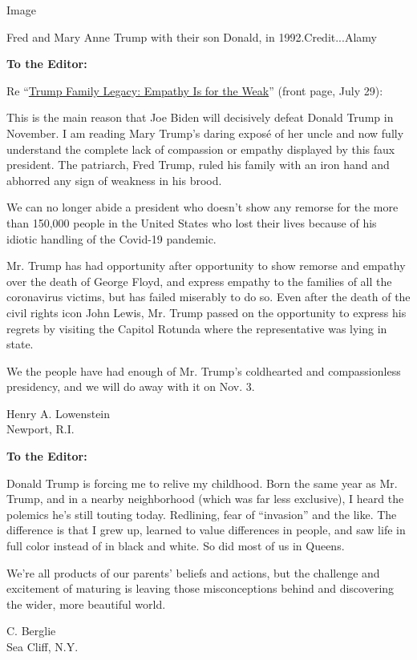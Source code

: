 Image

Fred and Mary Anne Trump with their son Donald, in 1992.Credit...Alamy

\textbf{To the Editor:}

Re
``\href{https://www.nytimes.com/2020/07/28/us/politics/donald-fred-trump.html}{Trump
Family Legacy: Empathy Is for the Weak}'' (front page, July 29):

This is the main reason that Joe Biden will decisively defeat Donald
Trump in November. I am reading Mary Trump's daring exposé of her uncle
and now fully understand the complete lack of compassion or empathy
displayed by this faux president. The patriarch, Fred Trump, ruled his
family with an iron hand and abhorred any sign of weakness in his brood.

We can no longer abide a president who doesn't show any remorse for the
more than 150,000 people in the United States who lost their lives
because of his idiotic handling of the Covid-19 pandemic.

Mr. Trump has had opportunity after opportunity to show remorse and
empathy over the death of George Floyd, and express empathy to the
families of all the coronavirus victims, but has failed miserably to do
so. Even after the death of the civil rights icon John Lewis, Mr. Trump
passed on the opportunity to express his regrets by visiting the Capitol
Rotunda where the representative was lying in state.

We the people have had enough of Mr. Trump's coldhearted and
compassionless presidency, and we will do away with it on Nov. 3.

Henry A. Lowenstein\\
Newport, R.I.

\textbf{To the Editor:}

Donald Trump is forcing me to relive my childhood. Born the same year as
Mr. Trump, and in a nearby neighborhood (which was far less exclusive),
I heard the polemics he's still touting today. Redlining, fear of
``invasion'' and the like. The difference is that I grew up, learned to
value differences in people, and saw life in full color instead of in
black and white. So did most of us in Queens.

We're all products of our parents' beliefs and actions, but the
challenge and excitement of maturing is leaving those misconceptions
behind and discovering the wider, more beautiful world.

C. Berglie\\
Sea Cliff, N.Y.

